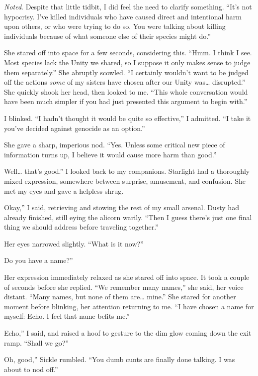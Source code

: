 \textit{Noted}. Despite that little tidbit, I did feel the need to clarify something. “It’s not hypocrisy. I’ve killed individuals who have caused direct and intentional harm upon others, or who were trying to do so. You were talking about killing individuals because of what someone else of their species might do.”

She stared off into space for a few seconds, considering this. “Hmm. I think I see. Most species lack the Unity we shared, so I suppose it only makes sense to judge them separately.” She abruptly scowled. “I certainly wouldn’t want to be judged off the actions \textit{some} of my sisters have chosen after our Unity was… disrupted.” She quickly shook her head, then looked to me. “This whole conversation would have been much simpler if you had just presented this argument to begin with.”

I blinked. “I hadn’t thought it would be quite so effective,” I admitted. “I take it you’ve decided against genocide as an option.”

She gave a sharp, imperious nod. “Yes. Unless some critical new piece of information turns up, I believe it would cause more harm than good.”

\leavevmode{}Well… that’s good.” I looked back to my companions. Starlight had a thoroughly mixed expression, somewhere between surprise, amusement, and confusion. She met my eyes and gave a helpless shrug.

\leavevmode{}Okay,” I said, retrieving and stowing the rest of my small arsenal. Dusty had already finished, still eying the alicorn warily. “Then I guess there’s just one final thing we should address before traveling together.”

Her eyes narrowed slightly. “What is it now?”

\leavevmode{}Do you have a name?”

Her expression immediately relaxed as she stared off into space. It took a couple of seconds before she replied. “We remember many names,” she said, her voice distant. “Many names, but none of them are… mine.” She stared for another moment before blinking, her attention returning to me. “I have chosen a name for myself: Echo. I feel that name befits me.”

\leavevmode{}Echo,” I said, and raised a hoof to gesture to the dim glow coming down the exit ramp. “Shall we go?”

\leavevmode{}Oh, good,” Sickle rumbled. “You dumb cunts are finally done talking. I was about to nod off.”

